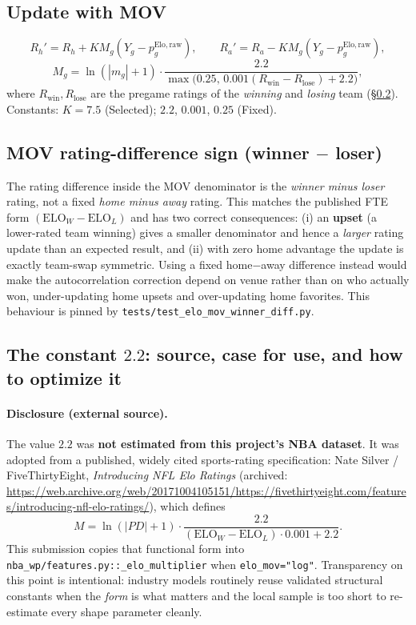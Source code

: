 \documentclass[10pt]{article}
\newcommand{\code}[1]{\texttt{#1}}
\begin{document}
\subsection{Update with MOV}
\[
R_h' = R_h + K M_g (Y_g-p_g^{\mathrm{Elo,raw}}),\qquad
R_a' = R_a - K M_g (Y_g-p_g^{\mathrm{Elo,raw}}),
\]
\[
M_g
=
\ln(|m_g|+1)
\cdot
\frac{2.2}{\max\bigl(0.25,\,0.001(R_{\mathrm{win}}-R_{\mathrm{lose}})+2.2\bigr)},
\]
where \(R_{\mathrm{win}},R_{\mathrm{lose}}\) are the pregame ratings of the
\emph{winning} and \emph{losing} team (\S\ref{sec:movsign}). Constants:
\(K=7.5\) (Selected); \(2.2\), \(0.001\), \(0.25\) (Fixed).

\subsection{MOV rating-difference sign (winner \(-\) loser)}
\label{sec:movsign}
The rating difference inside the MOV denominator is the \emph{winner minus
loser} rating, not a fixed \emph{home minus away} rating. This matches the
published FTE form \((\mathrm{ELO}_W-\mathrm{ELO}_L)\) and has two correct
consequences: (i) an \textbf{upset} (a lower-rated team winning) gives a
smaller denominator and hence a \emph{larger} rating update than an expected
result, and (ii) with zero home advantage the update is exactly team-swap
symmetric. Using a fixed home\(-\)away difference instead would make the
autocorrelation correction depend on venue rather than on who actually won,
under-updating home upsets and over-updating home favorites. This behaviour is
pinned by \code{tests/test\_elo\_mov\_winner\_diff.py}.

\subsection{The constant \(2.2\): source, case for use, and how to optimize it}
\label{sec:mov}

\paragraph{Disclosure (external source).}
The value \(2.2\) was \textbf{not estimated from this project's NBA dataset}.
It was adopted from a published, widely cited sports-rating specification:
Nate Silver / FiveThirtyEight,
\textit{Introducing NFL Elo Ratings}
(archived:
\url{https://web.archive.org/web/20171004105151/https://fivethirtyeight.com/features/introducing-nfl-elo-ratings/}),
which defines
\[
M
=
\ln(|PD|+1)
\cdot
\frac{2.2}{(\mathrm{ELO}_W-\mathrm{ELO}_L)\cdot 0.001 + 2.2}.
\]
This submission copies that functional form into
\code{nba\_wp/features.py::\_elo\_multiplier}
when \code{elo\_mov="log"}. Transparency on this point is intentional:
industry models routinely reuse validated structural constants when the
\emph{form} is what matters and the local sample is too short to re-estimate
every shape parameter cleanly.
\end{document}
